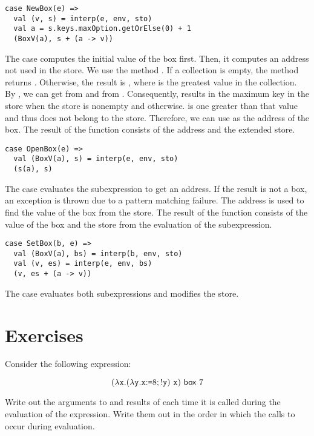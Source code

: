 \begin{verbatim}
case NewBox(e) =>
  val (v, s) = interp(e, env, sto)
  val a = s.keys.maxOption.getOrElse(0) + 1
  (BoxV(a), s + (a -> v))
\end{verbatim}

The  case computes the initial value of the box first. Then, it
computes an address not used in the store. We use the method .
If a collection is empty, the method returns . Otherwise, the
result is , where  is the greatest value in the collection.
By , we can get  from  and 
from . Consequently,  results
in the maximum key in the store when the store is nonempty and 
otherwise.  is one greater than that value and thus does not belong to
the store. Therefore, we can use  as the address of the box.
The result of the function consists of the address and the extended store.

\begin{verbatim}
case OpenBox(e) =>
  val (BoxV(a), s) = interp(e, env, sto)
  (s(a), s)
\end{verbatim}

The  case evaluates the subexpression to get an address.
If the result is not a box, an exception is thrown due to a pattern matching
failure. The address is used to find the value of the box from the store.
The result of the function consists of the value of the box and the store from
the evaluation of the subexpression.

\begin{verbatim}
case SetBox(b, e) =>
  val (BoxV(a), bs) = interp(b, env, sto)
  val (v, es) = interp(e, env, bs)
  (v, es + (a -> v))
\end{verbatim}

The  case evaluates both subexpressions and modifies the store.

\section{Exercises}

\begin{exercise}

Consider the following expression:

\[
  (\lambda\texttt{x}.(\lambda\texttt{y}.\texttt{x}{:}\texttt{=}8;!\texttt{y})\ \texttt{x})\ \textsf{box}\ 7
\]

Write out the arguments to and results of  each time it is called
during the evaluation of the expression. Write them out in the order in
which the calls to  occur during evaluation.

\end{exercise}

